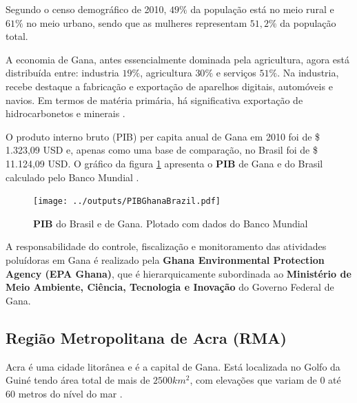Segundo o censo demográfico de 2010, $49\%$ da população está no meio rural e 
$61\%$ no meio urbano, sendo que as mulheres representam $51,2\%$ da população
total.

A economia de Gana, antes essencialmente dominada pela agricultura, 
agora está distribuída entre: industria $19\%$, agricultura $30\%$ 
e serviços $51\%$. Na industria, recebe destaque a fabricação e exportação de aparelhos digitais, 
automóveis e navios. Em termos de matéria primária, há significativa 
exportação de hidrocarbonetos e minerais
 \citep{ghanacensus2013}.%
 

O produto interno bruto (PIB) per capita anual de Gana em 2010 foi
de \$ 1.323,09 USD e, apenas como uma base de comparação, no Brasil foi de \$ 11.124,09 USD.%
O gráfico da figura \ref{fg:pib} apresenta o \textbf{PIB} de Gana e do Brasil 
calculado pelo Banco Mundial \citep{bancomundial}.

\begin{figure}[H]
\begin{center}
  \texttt{[image: ../outputs/PIBGhanaBrazil.pdf]}
  \caption{\textbf{PIB} do Brasil e de Gana. Plotado com dados do 
           Banco Mundial \citep{bancomundial} \label{fg:pib}}
\end{center}
\end{figure}

A responsabilidade do controle, fiscalização e monitoramento das 
atividades poluídoras em Gana é realizado pela 
\textbf{Ghana Environmental Protection Agency (EPA Ghana)}, que é 
hierarquicamente subordinada ao 
\textbf{Ministério de Meio Ambiente, Ciência, Tecnologia e Inovação} do 
Governo Federal de Gana.

\subsection{Região Metropolitana de Acra \textbf{(RMA)}}

Acra é uma cidade litorânea e é a capital de Gana. Está localizada 
no Golfo da Guiné tendo área total de mais de  $2500 km^2$, com elevações que 
variam de 0 até 60 metros do nível do mar \citep{ARKU2008}.

